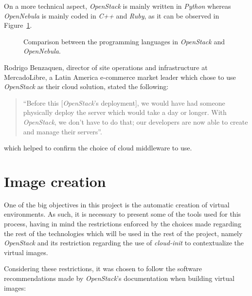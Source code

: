 On a more technical aspect, \textit{OpenStack} is mainly written in \textit{Python} whereas \textit{OpenNebula} is mainly coded in \textit{C++} and \textit{Ruby}, as it can be observed in Figure~\ref{fig:code-stack-nebula}.

\begin{figure}[h!]
  \begin{center}
    \leavevmode
    \caption{Comparison between the programming languages in \textit{OpenStack} and \textit{OpenNebula}.~\cite{ohloh}}
    \label{fig:code-stack-nebula}
  \end{center}
\end{figure}

Rodrigo Benzaquen, director of site operations and infrastructure at MercadoLibre, a Latin America e-commerce market leader which chose to use \textit{OpenStack} as their cloud solution, stated the following:

\begin{quote}
 ``Before this [\textit{OpenStack}'s deployment], we would have had someone physically deploy the server which would take a day or longer. With \textit{OpenStack}, we don't have to do that; our developers are now able to create and manage their servers''\cite{openstack-userstories}.
\end{quote}

which helped to confirm the choice of cloud middleware to use.


\clearpage
\section{Image creation} \label{sec:iso}

One of the big objectives in this project is the automatic creation of virtual environments. As such, it is necessary to present some of the tools used for this process, having in mind the restrictions enforced by the choices made regarding the rest of the technologies which will be used in the rest of the project, namely \textit{OpenStack} and its restriction regarding the use of \textit{cloud-init} to contextualize the virtual images.

Considering these restrictions, it was chosen to follow the software recommendations made by \textit{OpenStack}'s documentation when building virtual images:

